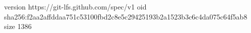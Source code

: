 version https://git-lfs.github.com/spec/v1
oid sha256:f2aa2affddaa751c53100fbd2c8e5c29425193b2a1523b3c6c4da075c64f5ab8
size 1386

